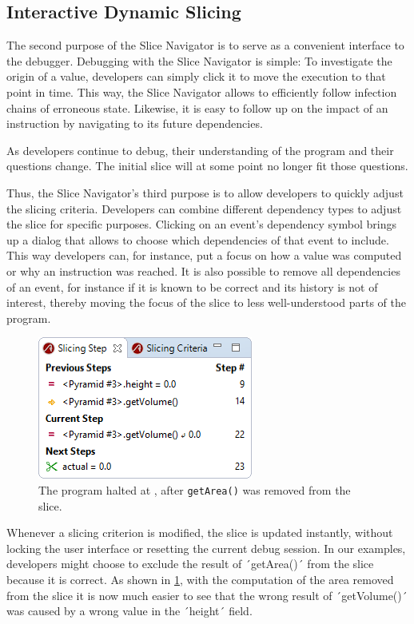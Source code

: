 \documentclass[
			english,
			review,
			]{elsarticle}
\begin{document}
\subsection{Interactive Dynamic Slicing}

The second purpose of the Slice Navigator is to serve as a convenient interface to the debugger.
Debugging with the Slice Navigator is simple:
To investigate the origin of a value, developers can simply click it to move the execution to that point in time.
This way, the Slice Navigator allows to efficiently follow infection chains of erroneous state.
Likewise, it is easy to follow up on the impact of an instruction by navigating to its future dependencies.

As developers continue to debug, their understanding of the program and their questions change.
The initial slice will at some point no longer fit those questions.

Thus, the Slice Navigator's third purpose is to allow developers to quickly adjust the slicing criteria.
Developers can combine different dependency types to adjust the slice for specific purposes.
Clicking on an event's dependency symbol brings up a dialog that allows to choose which dependencies of that event to include.
This way developers can, for instance, put a focus on how a value was computed or why an instruction was reached.
It is also possible to remove all dependencies of an event, for instance if it is known to be correct and its history is not of interest, thereby moving the focus of the slice to less well-understood parts of the program.

\begin{figure}
	\centering
		\includegraphics[width=0.40\linewidth]{slice2.png}
	\caption{The program halted at , after \lstinline{getArea()} was removed from the slice.}
	\label{fig:slice2}
\end{figure}

Whenever a slicing criterion is modified, the slice is updated instantly, without locking the user interface or resetting the current debug session.
In our examples, developers might choose to exclude the result of ´getArea()´ from the slice because it is correct.
As shown in \cref{fig:slice2}, with the computation of the area removed from the slice it is now much easier to see that the wrong result of ´getVolume()´ was caused by a wrong value in the ´height´ field.
\end{document}
